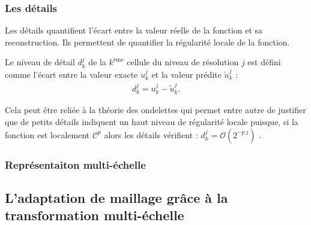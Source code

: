     \subsubsection{Les détails}
        Les détails quantifient l'écart entre la valeur réelle de la fonction et sa reconstruction. 
        Ils permettent de quantifier la régularité locale de la fonction.
        \begin{definition}[Détails]
            Le niveau de détail $d_k^j$ de la $k^{\mathrm{ème}}$ cellule du niveau de résolution $j$ est défini comme l'écart
            entre la valeur exacte $u^j_k$ et la valeur prédite $\tilde{u}^j_k$ : 
            \begin{align}
                d_k^j = u^j_k - \tilde{u}^j_k.
            \end{align}
        \end{definition}
        Cela peut être reliée à la théorie des ondelettes \cite{KaberPostel1999,duart2011} qui permet entre autre de justifier 
        que de petits détails indiquent un haut niveau de régularité locale puisque, si la fonction est localement $\mathcal{C}^p$
        alors les détails vérifient : $d_k^j = \mathcal{O}(2^{-p\, j})$ \cite{KaberPostel1999}.
    \subsubsection{Représentaiton multi-échelle}
\subsection{L'adaptation de maillage grâce à la transformation multi-échelle}
        



